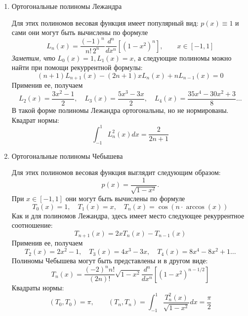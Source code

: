 \begin{enumerate}
    \item Ортогональные полиномы Лежандра
    \vspace{5pt}

    Для этих полиномов весовая функция имеет популярный вид: $p(x) \equiv 1$ и сами они могут быть вычислены по формуле
    \begin{equation}
        \displaystyle L_n(x) = \frac{(-1)^n}{n!\, 2^n} \frac{d^n}{dx^n} \left[ \left( 1 - x^2 \right)^n \right], \qquad x \in [-1, 1] \label{eq:legendre}
    \end{equation}
    \emph{Заметим, что} $ \displaystyle L_0(x) = 1, L_1(x) = x$, а следующие полиномы можно найти при помощи рекуррентной
    формулы:
    \begin{equation*}
    (n+1)
        L_{n+1}(x) - (2n+1)xL_n(x) + nL_{n-1}(x) = 0
    \end{equation*}
    Применив ее, получаем
    \begin{equation*}
        L_2(x) = \frac{3x^2-1}{2}, \quad L_3(x) = \frac{5x^3-3x}{2}, \quad L_4(x) = \frac{35x^4-30x^2+3}{8}\dots
    \end{equation*}
    В такой форме полиномы Лежандра ортогональны, но не нормированы. Квадрат нормы:
    \begin{equation*}
        \int_{-1}^{1} L_n^2(x)dx = \frac{2}{2n+1}
    \end{equation*}

    \item Ортогональные полиномы Чебышева
    \vspace{5pt}

    Для этих полиномов весовая функция выглядит следующим образом:
    \begin{equation*}
        p(x) = \frac{1}{\sqrt{1-x^2}}.
    \end{equation*}
    При $x \in [-1, 1]$ они могут быть вычислены по формуле
    \begin{equation}
        T_0(x) = 1, \quad T_1(x) = x, \quad T_n(x) = \cos \left( n \cdot \arccos(x) \right) \label{eq:chebyshev}
    \end{equation}
    Как и для полиномов Лежандра, здесь имеет место следующее рекуррентное соотношение:
    \begin{equation*}
        T_{n+1}(x) = 2xT_n(x) - T_{n-1}(x)
    \end{equation*}
    Применив ее, получаем
    \begin{equation*}
        T_2(x) = 2x^2 - 1, \quad T_3(x) = 4x^3 -3x, \quad T_4(x) = 8x^4 -8x^2 + 1\dots
    \end{equation*}
    Полиномы Чебышева могут быть представлены и в другом виде:
    \begin{equation}
        T_n(x) = \frac{(-2)^n n!}{(2n)!}\sqrt{1-x^2}\frac{d^n}{dx^n}\left[ \left( 1 - x^2 \right)^{n-1/2} \right] \label{eq:chebyshev2}
    \end{equation}
    Квадраты нормы:
    \begin{equation*}
    (T_0, T_0)
        = \pi, \qquad (T_n, T_n) = \int_{-1}^{1} \frac{T_n^2(x)}{\sqrt{1-x^2}}dx = \frac{\pi}{2}
    \end{equation*}
\end{enumerate}
